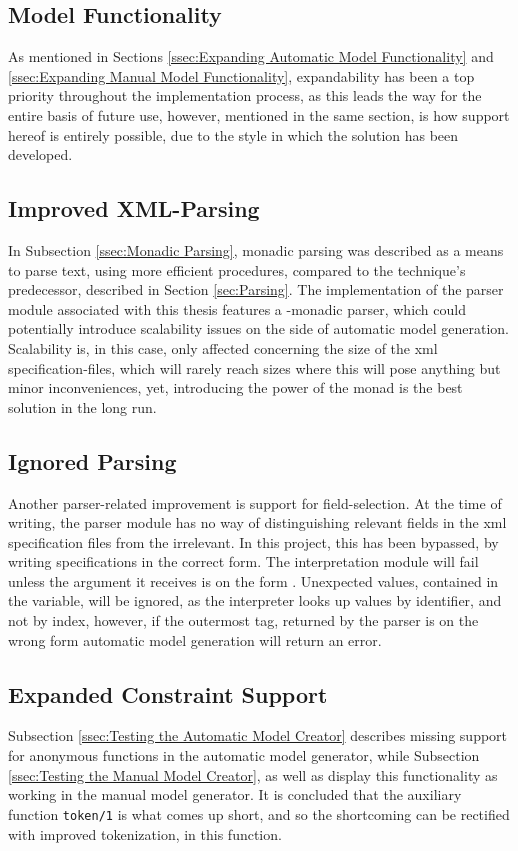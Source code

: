 \subsection{Model Functionality}
As mentioned in Sections \ref{ssec:Expanding Automatic Model Functionality} and \ref{ssec:Expanding Manual Model Functionality}, expandability has been a top priority throughout the implementation process, as this leads the way for the entire basis of future use, however, mentioned in the same section, is how support hereof is entirely possible, due to the style in which the solution has been developed. 
\subsection{Improved XML-Parsing}
In Subsection \ref{ssec:Monadic Parsing}, monadic parsing was described as a means to parse text, using more efficient procedures, compared to the technique's predecessor, described in Section \ref{sec:Parsing}. The implementation of the parser module associated with this thesis features a -monadic parser, which could potentially introduce scalability issues on the side of automatic model generation. Scalability is, in this case, only affected concerning the size of the xml specification-files, which will rarely reach sizes where this will pose anything but minor inconveniences, yet, introducing the power of the monad is the best solution in the long run.
\subsection{Ignored Parsing}
Another parser-related improvement is support for field-selection. At the time of writing, the parser module has no way of distinguishing relevant fields in the xml specification files from the irrelevant. In this project, this has been bypassed, by writing specifications in the correct form. The interpretation module will fail unless the argument it receives is on the form . Unexpected values, contained in the  variable, will be ignored, as the interpreter looks up values by identifier, and not by index, however, if the outermost tag, returned by the parser is on the wrong form automatic model generation will return an error.
\newpage
\subsection{Expanded Constraint Support}
Subsection \ref{ssec:Testing the Automatic Model Creator} describes missing support for anonymous functions in the automatic model generator, while Subsection \ref{ssec:Testing the Manual Model Creator}, as well as  display this functionality as working in the manual model generator. It is concluded that the auxiliary function \lstinline{token/1} is what comes up short, and so the shortcoming can be rectified with improved tokenization, in this function.
